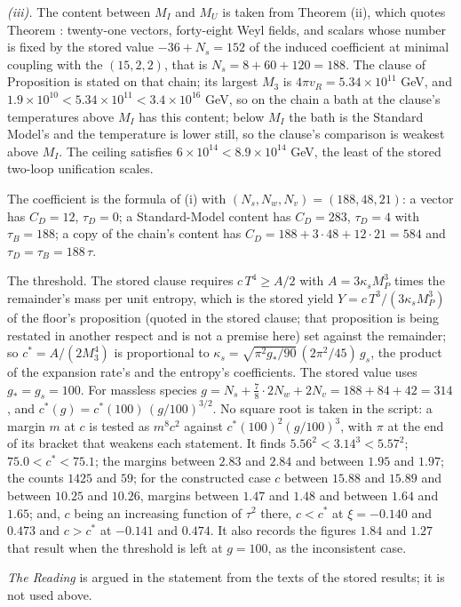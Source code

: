 \emph{(iii).} The content between $M_{I}$ and $M_{U}$ is taken from Theorem (ii), which quotes Theorem : twenty-one vectors, forty-eight Weyl fields, and scalars whose number is fixed by the stored value $-36 + N_{s} = 152$ of the induced coefficient at minimal coupling with the $(15,2,2)$, that is $N_{s} = 8 + 60 + 120 = 188$. The clause of Proposition  is stated on that chain; its largest $M_{3}$ is $4\pi v_{R} = 5.34 \times 10^{11}$ GeV, and $1.9 \times 10^{10} < 5.34 \times 10^{11} < 3.4 \times 10^{16}$ GeV, so on the chain a bath at the clause's temperatures above $M_{I}$ has this content; below $M_{I}$ the bath is the Standard Model's and the temperature is lower still, so the clause's comparison is weakest above $M_{I}$. The ceiling satisfies $6 \times 10^{14} < 8.9 \times 10^{14}$ GeV, the least of the stored two-loop unification scales.

The coefficient is the formula of (i) with $(N_{s}, N_{w}, N_{v}) = (188, 48, 21)$: a vector has $C_{D} = 12$, $\tau_{D} = 0$; a Standard-Model content has $C_{D} = 283$, $\tau_{D} = 4$ with $\tau_{B} = 188$; a copy of the chain's content has $C_{D} = 188 + 3 \cdot 48 + 12 \cdot 21 = 584$ and $\tau_{D} = \tau_{B} = 188\,\tau$.

The threshold. The stored clause requires $c\,T^{4} \ge A/2$ with $A = 3\kappa_{s}M_{P}^{3}$ times the remainder's mass per unit entropy, which is the stored yield $Y = c\,T^{3}/(3\kappa_{s}M_{P}^{3})$ of the floor's proposition (quoted in the stored clause; that proposition is being restated in another respect and is not a premise here) set against the remainder; so $c^{*} = A/(2M_{3}^{4})$ is proportional to $\kappa_{s} = \sqrt{\pi^{2}g_{*}/90}\,(2\pi^{2}/45)\,g_{s}$, the product of the expansion rate's and the entropy's coefficients. The stored value uses $g_{*} = g_{s} = 100$. For massless species $g = N_{s} + \tfrac78 \cdot 2N_{w} + 2N_{v} = 188 + 84 + 42 = 314$, and $c^{*}(g) = c^{*}(100)\,(g/100)^{3/2}$. No square root is taken in the script: a margin $m$ at $c$ is tested as $m^{8}c^{2}$ against $c^{*}(100)^{2}(g/100)^{3}$, with $\pi$ at the end of its bracket that weakens each statement. It finds $5.56^{2} < 3.14^{3} < 5.57^{2}$; $75.0 < c^{*} < 75.1$; the margins between $2.83$ and $2.84$ and between $1.95$ and $1.97$; the counts $1425$ and $59$; for the constructed case $c$ between $15.88$ and $15.89$ and between $10.25$ and $10.26$, margins between $1.47$ and $1.48$ and between $1.64$ and $1.65$; and, $c$ being an increasing function of $\tau^{2}$ there, $c < c^{*}$ at $\xi = -0.140$ and $0.473$ and $c > c^{*}$ at $-0.141$ and $0.474$. It also records the figures $1.84$ and $1.27$ that result when the threshold is left at $g = 100$, as the inconsistent case.

\emph{The Reading} is argued in the statement from the texts of the stored results; it is not used above.
